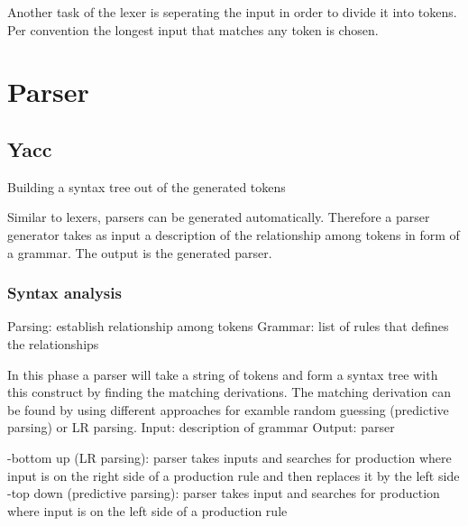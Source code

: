 Another task of the lexer is seperating the input in order to divide it into tokens.
Per convention the longest input that matches any token is chosen. \cite{Mogensen.2017}






\section{Parser}\label{sec:BackgroundParser}
\subsection{Yacc}\label{sec:BackgroundYacc}

Building a syntax tree out of the generated tokens \cite{Mogensen.2017}

Similar to lexers, parsers can be generated automatically.
Therefore a parser generator takes as input a description of the relationship among tokens in form of a grammar. The output is the generated parser. \cite{LexYacc.1992}
 
\subsubsection{Syntax analysis}
Parsing: establish relationship among tokens \cite{LexYacc.1992}
Grammar: list of rules that defines the relationships \cite{LexYacc.1992}

In this phase a parser will take a string of tokens and form a syntax tree with this construct by finding the matching derivations. The matching derivation can be found by using different approaches for examble random guessing (predictive parsing) or LR parsing.
Input: description of grammar \cite{LexYacc.1992}
Output: parser \cite{LexYacc.1992}

-bottom up (LR parsing):
parser takes inputs and searches for production where input is on the right side of a production rule and then replaces it by the left side
-top down (predictive parsing):
parser takes input and searches for production where input is on the left side of a production rule

